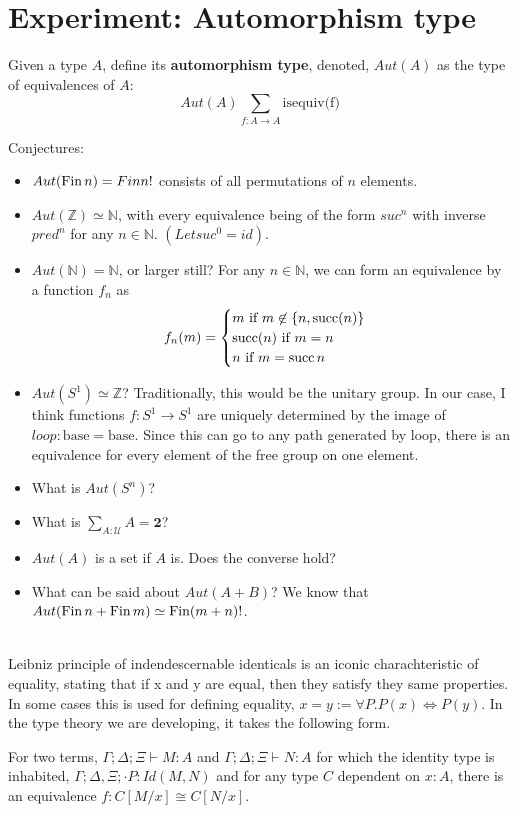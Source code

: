 \section{Experiment: Automorphism type}
\begin{defn}
Given a type $A$, define its \textbf{automorphism type}, denoted, $Aut(A)$ as the type of equivalences of $A$:
\[
Aut(A) \sum_{f : A \to A}\text{isequiv(f)}
\]
\end{defn}
Conjectures:
\begin{itemize}
\item $Aut(\operatorname{\text{Fin}} n) = Fin n!$ consists of all permutations of $n$ elements.
\item $Aut(\mathbb{Z}) \simeq \mathbb{N}$, with every equivalence being of the form $suc^n$ with inverse $pred^n$ for any $n \in \mathbb{N}$. $(Let suc^0 = id)$.
\item $Aut(\mathbb{N}) = \mathbb{N}$, or larger still? For any $n \in \mathbb{N}$, we can form an equivalence by a function $f_n$ as
\[
f_n(m) = \begin{cases} m \mbox{ if }m \not \in \{n, \operatorname{\text{succ}}(n)\}\\
       \operatorname{\text{succ}}(n) \mbox{ if } m = n\\
       n \mbox{ if } m = \operatorname{\text{succ}} n
       \end{cases}
\]       
\item $Aut(S^1) \simeq \mathbb{Z}$? Traditionally, this would be the unitary group. In our case, I think functions $f : S^1 \to S^1$ are uniquely determined by the image of $loop : \text{base} = \text{base}$. Since this can go to any path generated by loop, there is an equivalence for every element of the free group on one element.
\item What is $Aut(S^n)$?
\item What is $\sum_{A : \mathcal{U}}A = \mathbf{2}$?
\item $Aut(A)$ is a set if $A$ is. Does the converse hold?
\item What can be said about $Aut(A + B)$? We know that $Aut(\operatorname{\text{Fin}} n + \operatorname{\text{Fin}} m) \simeq \operatorname{\text{Fin}} (m + n)!$.
\end{itemize}
\newpage
\\
Leibniz principle of indendescernable identicals is an iconic charachteristic of equality, stating that if x and y are equal, then they satisfy they same properties. In some cases this is used for defining equality, $x = y := \forall P. P(x) \iff P(y)$. In the type theory we are developing, it takes the following form.
\begin{thm}
For two terms, $\Gamma; \Delta; \Xi \vdash M : A$ and $\Gamma; \Delta; \Xi \vdash N : A$ for which the identity type is inhabited, $\Gamma; \Delta, \Xi ; \cdot P : Id(M,N)$ and for any type $C$ dependent on $x :A$, there is an equivalence $f : C[M/x] \cong C[N/x]$.
\end{thm}
